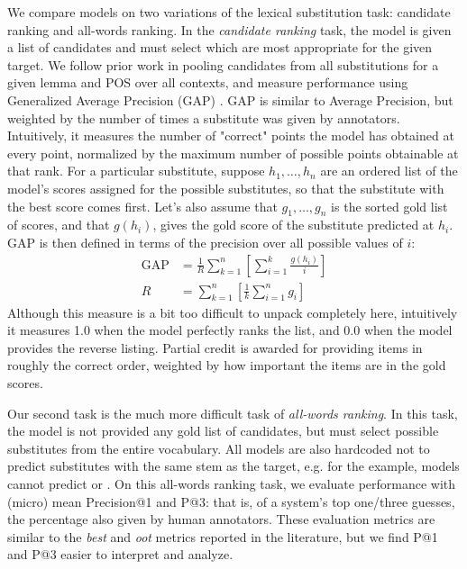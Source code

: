 We compare models on two variations of the lexical substitution task: candidate
ranking and all-words ranking. In the {\em candidate ranking} task, the model
is given a list of candidates and must select which are most appropriate for
the given target. We follow prior work in pooling candidates from all
substitutions for a given lemma and POS over all contexts, and measure
performance using Generalized Average Precision (GAP) \cite{kishida:2005:gap}.
GAP is similar to Average Precision, but weighted by the number of times a
substitute was given by annotators. Intuitively, it measures the number of
"correct" points the model has obtained at every point, normalized by the
maximum number of possible points obtainable at that rank.  For a particular
substitute, suppose $h_1,\ldots,h_n$ are an ordered list of the model's scores
assigned for the possible substitutes, so that the substitute with the best
score comes first. Let's also assume that $g_1,\ldots,g_n$ is the sorted gold
list of scores, and that $g(h_i)$,  gives the gold score of the
substitute predicted at $h_i$. GAP is then defined in terms of the precision
over all possible values of $i$:
\begin{align*}
  \text{GAP} & = \frac{1}{R}\sum_{k=1}^n\left[\sum_{i=1}^k\frac{g(h_i)}{i}\right]\\
  R & = \sum_{k=1}^n\left[\frac{1}{k}\sum_{i=1}^n g_i\right]
\end{align*}
Although this measure is a bit too difficult to unpack completely here,
intuitively it measures 1.0 when the model perfectly ranks the list, and 0.0
when the model provides the reverse listing. Partial credit is awarded for
providing items in roughly the correct order, weighted by how important the
items are in the gold scores.

Our second task is the much more difficult task of {\em all-words ranking}. In
this task, the model is not provided any gold list of candidates, but must
select possible substitutes from the entire vocabulary. All models are also
hardcoded not to predict substitutes with the same stem as the target, e.g. for
the  example, models cannot predict  or
.
On this all-words ranking task, we evaluate performance with (micro) mean
Precision@1 and P@3: that is, of a system's top one/three guesses, the
percentage also given by human annotators.  These evaluation metrics are
similar to the {\em best} and {\em oot} metrics reported in the literature, but
we find P@1 and P@3 easier to interpret and analyze.

